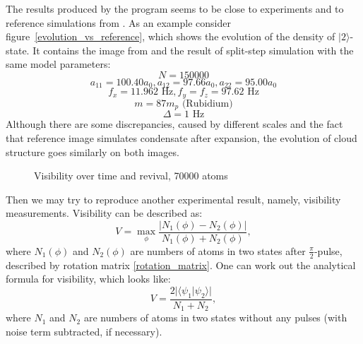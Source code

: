 \documentclass[12pt,notitlepage]{report}
\begin{document}
The results produced by the program seems to be close to experiments and to reference simulations from \cite{anderson-2009-80}.
As an example consider figure~\ref{evolution_vs_reference},
which shows the evolution of the density of $\vert2\rangle$-state.
It contains the image from \cite{anderson-2009-80} and the result of split-step simulation with the same model parameters:
\[ N = 150000 \]
\[ a_{11} = 100.40 a_0, a_{12} = 97.66 a_0, a_{22} = 95.00 a_0 \]
\[ f_x = 11.962 \textrm{ Hz}, f_y = f_z = 97.62 \textrm{ Hz} \]
\[ m = 87 m_p \textrm{ (Rubidium)}\]
\[ \Delta = 1 \textrm{ Hz} \]
Although there are some discrepancies,
caused by different scales and the fact that reference image simulates condensate after expansion,
the evolution of cloud structure goes similarly on both images.

\begin{figure}
\begin{center}
\qquad
{}
\end{center}
\caption{Visibility over time and revival, 70000 atoms}
\label{visibility_vs_reference}
\end{figure}

Then we may try to reproduce another experimental result, namely, visibility measurements.
Visibility can be described as:
\[ V = \max_{\phi} \frac{\lvert N_1(\phi) - N_2(\phi) \rvert}{N_1(\phi) + N_2(\phi)}, \]
where $N_1(\phi)$ and $N_2(\phi)$ are numbers of atoms in two states after $\frac{\pi}{2}$-pulse,
described by rotation matrix \ref{rotation_matrix}.
One can work out the analytical formula for visibility, which looks like:
\[ V = \frac{2 \lvert \langle \psi_1 \vert \psi_2 \rangle \rvert}{N_1 + N_2}, \]
where $N_1$ and $N_2$ are numbers of atoms in two states without any pulses (with noise term subtracted, if necessary).
\end{document}

